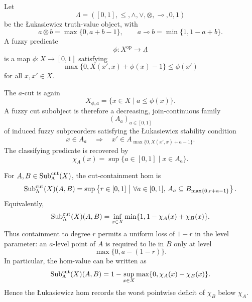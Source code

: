 \begin{example}
\label{ex:cut-subobjects-lukasiewicz}
    Let
    \[
        \Lambda=([0,1],\leq,\wedge,\vee,\otimes,\multimap,0,1)
    \]
    be the {\L}ukasiewicz truth-value object, with
    \[
        a\otimes b=\max\{0,a+b-1\},
        \qquad
        a\multimap b=\min\{1,1-a+b\}.
    \]
    A fuzzy predicate
    \[
        \phi:X^{\mathrm{op}}\to\underline{\Lambda}
    \]
    is a map \(\phi:X\to[0,1]\) satisfying
    \[
        \max\{0,X(x',x)+\phi(x)-1\}\leq \phi(x')
    \]
    for all \(x,x'\in X\).

    The \(a\)-cut is again
    \[
        X_{\phi,a}
        =
        \{x\in X\mid a\leq\phi(x)\}.
    \]
    A fuzzy cut subobject is therefore a decreasing, join-continuous family
    \[
        (A_a)_{a\in[0,1]}
    \]
    of induced fuzzy subpreorders satisfying the {\L}ukasiewicz stability condition
    \[
        x\in A_a
        \quad\Longrightarrow\quad
        x'\in A_{\max\{0,X(x',x)+a-1\}}.
    \]
    The classifying predicate is recovered by
    \[
        \chi_A(x)=\sup\{a\in[0,1]\mid x\in A_a\}.
    \]

    For \(A,B\in\mathrm{Sub}^{\mathrm{cut}}_\Lambda(X)\), the cut-containment hom is
    \[
        \mathrm{Sub}^{\mathrm{cut}}_\Lambda(X)(A,B)
        =
        \sup
        \left\{
            r\in[0,1]
            \ \middle|\
            \forall a\in[0,1],\,
            A_a\subseteq B_{\max\{0,r+a-1\}}
        \right\}.
    \]
    Equivalently,
    \[
        \mathrm{Sub}^{\mathrm{cut}}_\Lambda(X)(A,B)
        =
        \inf_{x\in X}
        \min\{1,1-\chi_A(x)+\chi_B(x)\}.
    \]
    Thus containment to degree \(r\) permits a uniform loss of \(1-r\) in the level parameter: an \(a\)-level point of \(A\) is required to lie in \(B\) only at level
    \[
        \max\{0,a-(1-r)\}.
    \]
    In particular, the hom-value can be written as
    \[
        \mathrm{Sub}^{\mathrm{cut}}_\Lambda(X)(A,B)
        =
        1-
        \sup_{x\in X}
        \max\{0,\chi_A(x)-\chi_B(x)\}.
    \]
    Hence the {\L}ukasiewicz hom records the worst pointwise deficit of \(\chi_B\) below \(\chi_A\).
\end{example}

